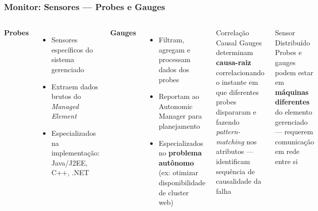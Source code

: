 \documentclass{beamer}
\begin{document}
  \begin{frame}
    \frametitle{Monitor: Sensores --- Probes e Gauges}
    \begin{columns}
      \textbf{Probes}
      \begin{itemize}
        \footnotesize
        \item Sensores específicos do sistema gerenciado
        \item Extraem dados brutos do \textit{Managed Element}
        \item Especializados na implementação: Java/J2EE, C++, .NET
      \end{itemize}
      \vspace{0.15cm}
      \textbf{Gauges}
      \begin{itemize}
        \footnotesize
        \item Filtram, agregam e processam dados dos probes
        \item Reportam ao Autonomic Manager para planejamento
        \item Especializados no \textbf{problema autônomo} (ex: otimizar disponibilidade de cluster web)
      \end{itemize}
      \begin{block}{Correlação Causal}
        \footnotesize
        Gauges determinam \textbf{causa-raiz} correlacionando o instante em que diferentes probes dispararam e fazendo \textit{pattern-matching} nos atributos --- identificam sequência de causalidade da falha
      \end{block}
      \begin{alertblock}{\footnotesize Sensor Distribuído}
        \footnotesize
        Probes e gauges podem estar em \textbf{máquinas diferentes} do elemento gerenciado --- requerem comunicação em rede entre si
      \end{alertblock}
    \end{columns}
  \end{frame}
\end{document}
